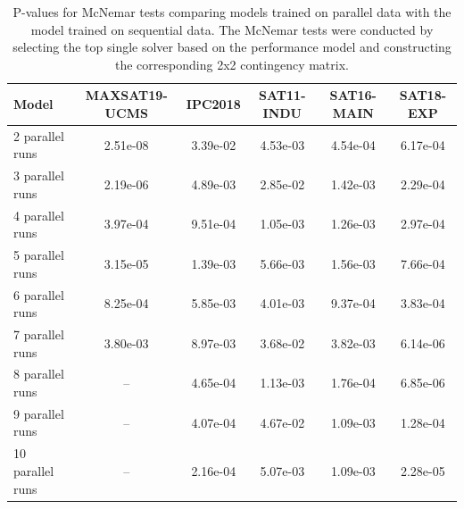 \begin{table}[ht]
\centering
\caption[P-Values for McNemar Tests Comparing Models Trained on Parallel vs. Sequential Data]{P-values for McNemar tests comparing models trained on parallel data with the model trained on sequential data. The McNemar tests were conducted by selecting the top single solver based on the performance model and constructing the corresponding 2x2 contingency matrix.}\label{p-values-macnemar-infjack}
\label{tab:scenarios2}
\begin{tabular}{lccccc}
\hline
Model & \small{MAXSAT19-UCMS} & IPC2018 & SAT11-INDU & SAT16-MAIN & SAT18-EXP \\ 
\hline
2 parallel runs & 2.51e-08 & 3.39e-02 & 4.53e-03 & 4.54e-04 & 6.17e-04 \\ 
3 parallel runs & 2.19e-06 & 4.89e-03 & 2.85e-02 & 1.42e-03 & 2.29e-04 \\ 
4 parallel runs & 3.97e-04 & 9.51e-04 & 1.05e-03 & 1.26e-03 & 2.97e-04 \\ 
5 parallel runs & 3.15e-05 & 1.39e-03 & 5.66e-03 & 1.56e-03 & 7.66e-04 \\ 
6 parallel runs & 8.25e-04 & 5.85e-03 & 4.01e-03 & 9.37e-04 & 3.83e-04 \\ 
7 parallel runs & 3.80e-03 & 8.97e-03 & 3.68e-02 & 3.82e-03 & 6.14e-06 \\ 
8 parallel runs & -- & 4.65e-04 & 1.13e-03 & 1.76e-04 & 6.85e-06 \\ 
9 parallel runs & -- & 4.07e-04 & 4.67e-02 & 1.09e-03 & 1.28e-04 \\ 
10 parallel runs & -- & 2.16e-04 & 5.07e-03 & 1.09e-03 & 2.28e-05 \\ 
   \hline
\end{tabular}
\end{table}

